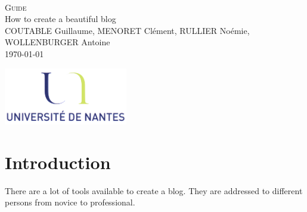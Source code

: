 \documentclass[a4paper,10pt]{article}
\begin{document}
\fancyhead[LE,CE,RE,LO,CO,RO]{}
\fancyfoot[LE,CE,RE,LO,CO,RO]{}
\renewcommand{\headrulewidth}{0.4pt}
\renewcommand{\footrulewidth}{0.4pt}

\begin{titlepage}

\vspace*{\fill}~
\begin{center}
{\large \textsc{Guide}} \\
\vspace{1cm}
{\LARGE How to create a beautiful blog} \\
\vspace{1cm}
COUTABLE Guillaume, MENORET Clément, RULLIER Noémie, WOLLENBURGER Antoine \\
\today
\end{center}
\vspace*{\fill}

\begin{center}
\noindent 
\includegraphics[height=2.5cm]{Images/universite.png}
\end{center}
\pagebreak
\end{titlepage}

\newpage
\tableofcontents 

\newpage
\pagestyle{fancy}

\section{Introduction}

There are a lot of tools available to create a blog. They are addressed to different persons from novice to professional.
\end{document}
